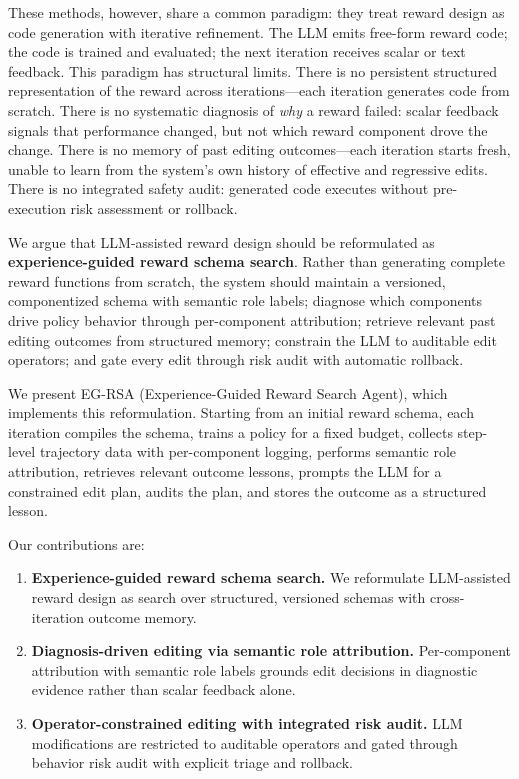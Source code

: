 \documentclass[11pt]{article}
\begin{document}
These methods, however, share a common paradigm: they treat reward design as code generation with iterative refinement. The LLM emits free-form reward code; the code is trained and evaluated; the next iteration receives scalar or text feedback. This paradigm has structural limits. There is no persistent structured representation of the reward across iterations---each iteration generates code from scratch. There is no systematic diagnosis of \emph{why} a reward failed: scalar feedback signals that performance changed, but not which reward component drove the change. There is no memory of past editing outcomes---each iteration starts fresh, unable to learn from the system's own history of effective and regressive edits. There is no integrated safety audit: generated code executes without pre-execution risk assessment or rollback.

We argue that LLM-assisted reward design should be reformulated as \textbf{experience-guided reward schema search}. Rather than generating complete reward functions from scratch, the system should maintain a versioned, componentized schema with semantic role labels; diagnose which components drive policy behavior through per-component attribution; retrieve relevant past editing outcomes from structured memory; constrain the LLM to auditable edit operators; and gate every edit through risk audit with automatic rollback.

We present EG-RSA (Experience-Guided Reward Search Agent), which implements this reformulation. Starting from an initial reward schema, each iteration compiles the schema, trains a policy for a fixed budget, collects step-level trajectory data with per-component logging, performs semantic role attribution, retrieves relevant outcome lessons, prompts the LLM for a constrained edit plan, audits the plan, and stores the outcome as a structured lesson.

Our contributions are:
\begin{enumerate}[leftmargin=*,nosep]
    \item \textbf{Experience-guided reward schema search.} We reformulate LLM-assisted reward design as search over structured, versioned schemas with cross-iteration outcome memory.
    \item \textbf{Diagnosis-driven editing via semantic role attribution.} Per-component attribution with semantic role labels grounds edit decisions in diagnostic evidence rather than scalar feedback alone.
    \item \textbf{Operator-constrained editing with integrated risk audit.} LLM modifications are restricted to auditable operators and gated through behavior risk audit with explicit triage and rollback.
\end{enumerate}
\end{document}
